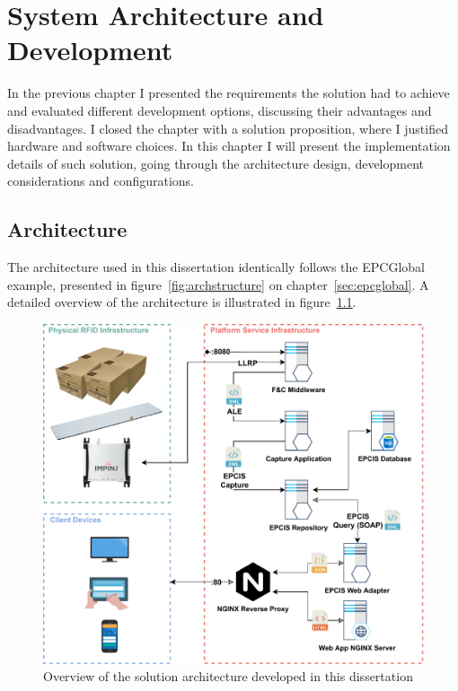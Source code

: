 \chapter{System Architecture and Development} \label{sec:systemdevelopment}

In the previous chapter I presented the requirements the solution had to achieve and evaluated different development options, discussing their advantages and disadvantages.
I closed the chapter with a solution proposition, where I justified hardware and software choices.
In this chapter I will present the implementation details of such solution, going through the architecture design, development considerations and configurations. 

\section{Architecture}

The architecture used in this dissertation identically follows the EPCGlobal example, presented in figure~\ref{fig:archstructure} on chapter~\ref{sec:epcglobal}.
A detailed overview of the architecture is illustrated in figure~\ref{fig:practicalarchitecture}.

\begin{figure}
    \centering
    \includegraphics[width=\textwidth]{figs/platform_diagram.pdf}
    \caption{Overview of the solution architecture developed in this dissertation} 
    \label{fig:practicalarchitecture}
\end{figure}

